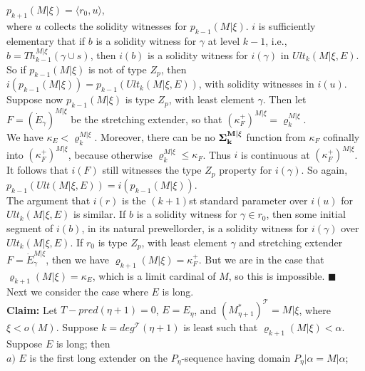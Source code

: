 \documentclass[12pt]{article}
\begin{document}
\indent \indent $p_{k+1} (M | \xi ) = \langle r_0 , u \rangle$,\\

where $u$ collects the solidity witnesses for $p_{k-1} (M | \xi )$.  $i$ is sufficiently elementary that if $b$ is a solidity witness for $\gamma$ at level $k - 1$, i.e., $b = Th_{k - 1}^{M | \xi} (\gamma \cup s )$, then $i(b)$ is a solidity witness for $i (\gamma)$ in $Ult_k (M | \xi , E)$.  So if $p_{k-1} (M | \xi )$ is not of type $Z_p$, then $i (p_{k-1} (M | \xi)) = p_{k-1} (Ult_k (M | \xi , E ))$, with solidity witnesses in $i(u)$.  Suppose now $p_{k-1} (M | \xi)$ is type $Z_p$, with least element $\gamma$.  Then let $F = (\dot{E}_\gamma)^{M| \xi}$ be the stretching extender, so that $(\kappa_F^+)^{M | \xi} = \varrho_k^{M | \xi}$.\\

We have $\kappa_E < \varrho_k^{M | \xi}$.  Moreover, there can be no $\bf{\Sigma}_k^{M | \xi}$ function from $\kappa_F$ cofinally into $(\kappa_F^+)^{M | \xi}$, because otherwise $\varrho_k^{M | \xi} \leq \kappa_F$.  Thus $i$ is continuous at $(\kappa_F^+)^{M | \xi}$.  It follows that $i(F)$ still witnesses the type $Z_p$ property for $i(\gamma)$.  So again, $p_{k-1} (Ult (M | \xi , E)) = i (p_{k-1} (M | \xi))$.\\

The argument that $i(r)$ is the $(k+1)$st standard parameter over $i(u)$ for $Ult_k (M | \xi , E)$ is similar.  If $b$ is a solidity witness for $\gamma \in r_0$, then some initial segment of $i(b)$, in its natural prewellorder, is a solidity witness for $i(\gamma)$ over $Ult_k (M | \xi , E)$.  If $r_0$ is type $Z_p$, with least element $\gamma$ and stretching extender $F = \dot{E}_\gamma^{M | \xi}$, then we have $\varrho_{k+1} (M | \xi) = \kappa_F^+$.  But we are in the case that $\varrho_{k+1} (M | \xi ) = \kappa_E$, which is a limit cardinal of $M$, so this is impossible. $\blacksquare$\\

Next we consider the case where $E$ is long.\\

\textbf{Claim:} Let $T-pred (\eta + 1 ) = 0$, $E = E_\eta$, and $(M_{\eta + 1}^*)^{\mathscr{T}} = M | \xi$, where $\xi < o(M)$.  Suppose $k = deg^{\mathscr{T}} (\eta + 1)$ is least such that $\varrho_{k+1} (M | \xi ) < \alpha$.  Suppose $E$ is long; then\\

\indent $a)$ $E$ is the first long extender on the $P_\eta$-sequence having domain $P_\eta | \alpha = M | \alpha$;\\
\end{document}
